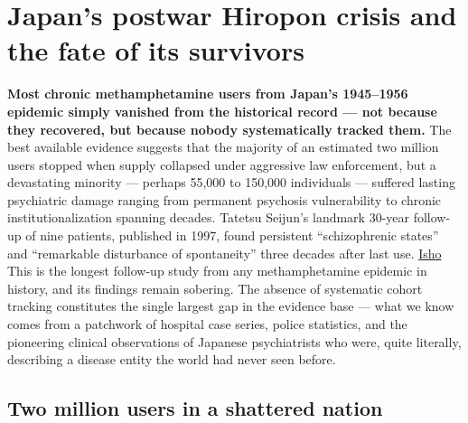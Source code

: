 ﻿\section{Japan's postwar Hiropon crisis and the fate of its survivors}\label{12_philopon-japans-postwar-hiropon-crisis-and-the-fate-of-its-survivors}

\textbf{Most chronic methamphetamine users from Japan's 1945--1956 epidemic simply vanished from the historical record --- not because they recovered, but because nobody systematically tracked them.} The best available evidence suggests that the majority of an estimated two million users stopped when supply collapsed under aggressive law enforcement, but a devastating minority --- perhaps 55,000 to 150,000 individuals --- suffered lasting psychiatric damage ranging from permanent psychosis vulnerability to chronic institutionalization spanning decades. Tatetsu Seijun's landmark 30-year follow-up of nine patients, published in 1997, found persistent ``schizophrenic states'' and ``remarkable disturbance of spontaneity'' three decades after last use. \href{https://webview.isho.jp/journal/detail/abs/10.11477/mf.1405904411}{Isho} This is the longest follow-up study from any methamphetamine epidemic in history, and its findings remain sobering. The absence of systematic cohort tracking constitutes the single largest gap in the evidence base --- what we know comes from a patchwork of hospital case series, police statistics, and the pioneering clinical observations of Japanese psychiatrists who were, quite literally, describing a disease entity the world had never seen before.

\subsection{Two million users in a shattered nation}\label{12_philopon-two-million-users-in-a-shattered-nation}


